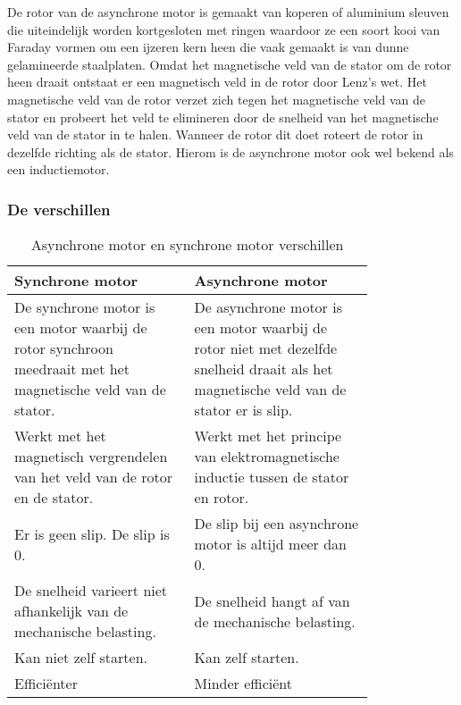 \vspace{0.5cm}

De rotor van de asynchrone motor is gemaakt van koperen of aluminium sleuven die uiteindelijk worden kortgesloten met ringen waardoor ze een soort kooi van Faraday vormen om een ijzeren kern heen die vaak gemaakt is van dunne gelamineerde staalplaten. Omdat het magnetische veld van de stator om de rotor heen draait ontstaat er een magnetisch veld in de rotor door Lenz’s wet. Het magnetische veld van de rotor verzet zich tegen het magnetische veld van de stator en probeert het veld te elimineren door de snelheid van het magnetische veld van de stator in te halen. Wanneer de rotor dit doet roteert de rotor in dezelfde richting als de stator. Hierom is de asynchrone motor ook wel bekend als een inductiemotor. \cite{web:DiffAsyncSync,web:SyncMotor,web:AsyncMotor}


\subsubsection{De verschillen}

\begin{table}[H]
	\caption{Asynchrone motor en synchrone motor verschillen}
	\label{tab:AsyncSyncVerschil}
	\centering
	\begin{tabular}{|p{0.4\linewidth}|p{0.4\linewidth}|}
		\hline
		\textbf{Synchrone motor} & \textbf{Asynchrone motor} \\
		\hline
		De synchrone motor is een motor waarbij de rotor synchroon meedraait met het magnetische veld van de stator. & De asynchrone motor is een motor waarbij de rotor niet met dezelfde snelheid draait als het magnetische veld van de stator er is slip. \\

		Werkt met het magnetisch vergrendelen van het veld van de rotor en de stator. & Werkt met het principe van elektromagnetische inductie tussen de stator en rotor. \\

		Er is geen slip. De slip is 0. & De slip bij een asynchrone motor is altijd meer dan 0. \\

		De snelheid varieert niet afhankelijk van de mechanische belasting. & De snelheid hangt af van de mechanische belasting. \\

		Kan niet zelf starten. & Kan zelf starten. \\

		Efficiënter & Minder efficiënt \\
		\hline
	\end{tabular}
\end{table}

